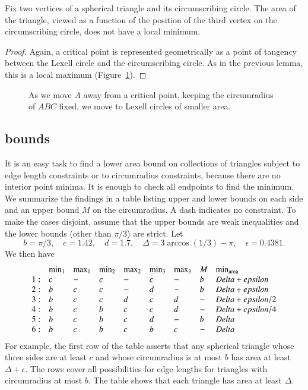 \begin{lemma} Fix two vertices of a spherical triangle
and its circumscribing circle.  The area of the triangle, viewed
as a function of the position of the third vertex on the
circumscribing circle, does not have a local minimum.
\end{lemma}

\begin{proof}  Again, a critical point is represented
geometrically as a point of tangency between the Lexell circle and
the circumscribing circle.  As in the previous lemma, this is a
local maximum (Figure~\ref{fig:13:B}).
\end{proof}

\begin{figure}[htb]
  \centering
  \caption{As we move $A$ away from a critical
point, keeping the circumradius of $ABC$ fixed, we move to Lexell
circles of smaller area.}
  \label{fig:13:B}
\end{figure}


\subsection{bounds}

It is an easy task to find a lower area bound on collections
of triangles subject to edge length constraints or to circumradius
constraints, because there are no interior point minima.  It is
enough to check all endpoints to find the minimum.  We summarize
the findings in a table listing upper and lower bounds on each
side and an upper bound $M$ on the circumradius.  A dash indicates
no constraint.   To make the cases disjoint, assume that the upper
bounds are weak inequalities and the lower bounds (other than $\pi/3$)
are strict.   Let
    $$
    b = \pi/3, \quad c = 1.42, \quad d = 1.7,\quad
    \Delta = 3\arccos(1/3)-\pi,\quad \epsilon = 0.4381.
    $$
We then have
$$
    \begin{array}{lllllllll}
 &\min_1&\max_1&\min_2&\max_2&\min_3&\max_3&M    &\min_{{\operatorname{area}}}\\
 1:&c &- &c &- &c &- &b &Delta+epsilon\\
 2:&b &c &c &- &d &- &b &Delta+epsilon\\
 3:&b &c &c &d &c &d &- &Delta+epsilon/2\\
 4:&b &c &b &c &c &d &- &Delta+epsilon/4\\
 5:&b &c &b &c &d &- &b &Delta\\
 6:&b &c &b &c &b &c &- &Delta
    \end{array}
$$
For example, the first row of the table 
asserts that any spherical triangle whose three sides are at least
$c$ and whose circumradius is at most $b$ has area at least $\Delta+\epsilon$.
 The rows cover all
possibilities for edge lengths for triangles with circumradius at most $b$.
The table shows that each triangle has area at least $\Delta$.


